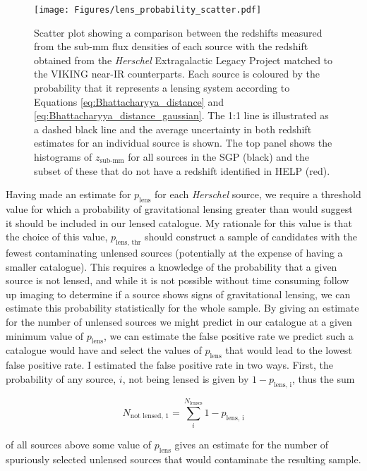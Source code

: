 \begin{figure}
    \centering
    \texttt{[image: Figures/lens\_probability\_scatter.pdf]}
    \caption{Scatter plot showing a comparison between the redshifts measured from the sub-mm flux densities of each source with the redshift obtained from the \textit{Herschel} Extragalactic Legacy Project matched to the VIKING near-IR counterparts. Each source is coloured by the probability that it represents a lensing system according to Equations \ref{eq:Bhattacharyya_distance} and \ref{eq:Bhattacharyya_distance_gaussian}. The 1:1 line is illustrated as a dashed black line and the average uncertainty in both redshift estimates for an individual source is shown. The top panel shows the histograms of $z_\textrm{sub-mm}$ for all sources in the SGP (black) and the subset of these that do not have a redshift identified in HELP (red).}
    \label{fig:lens_probability_scatter}
\end{figure}

Having made an estimate for $p_{\textrm{lens}}$ for each \textit{Herschel} source, we require a threshold value for which a probability of gravitational lensing greater than would suggest it should be included in our lensed catalogue. My rationale for this value is that the choice of this value, $p_{\textrm{lens, thr}}$ should construct a sample of candidates with the fewest contaminating unlensed sources (potentially at the expense of having a smaller catalogue). This requires a knowledge of the probability that a given source is not lensed, and while it is not possible without time consuming follow up imaging to determine if a source shows signs of gravitational lensing, we can estimate this probability statistically for the whole sample. By giving an estimate for the number of unlensed sources we might predict in our catalogue at a given minimum value of $p_{\textrm{lens}}$, we can estimate the false positive rate we predict such a catalogue would have and select the values of $p_{\textrm{lens}}$ that would lead to the lowest false positive rate. I estimated the false positive rate in two ways. First, the probability of any source, $i$, not being lensed is given by $1 - p_{\textrm{lens, i}}$, thus the sum

\begin{equation}
N_{\textrm{not lensed, 1}} = \sum_{i}^{N_{\textrm{lenses}}}{1 - p_{\textrm{lens, i}}}
\label{eq:unlensed_estimate_1}
\end{equation} 

of all sources above some value of $p_{\textrm{lens}}$ gives an estimate for the number of spuriously selected unlensed sources that would contaminate the resulting sample. 

